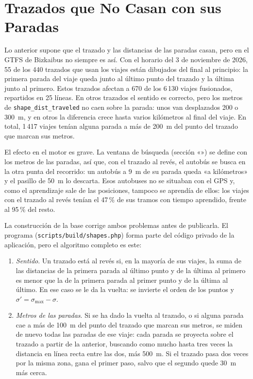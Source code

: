 \section{Trazados que No Casan con sus Paradas}
\label{sec:trazados-gtfs}

Lo anterior supone que el trazado y las distancias de las paradas casan, pero en el GTFS de Bizkaibus no siempre es así.
Con el horario del 3 de noviembre de 2026, 55 de los 440 trazados que usan los viajes están dibujados del final al
principio: la primera parada del viaje queda junto al último punto del trazado y la última junto al primero. Estos trazados afectan a
670 de los 6\,130 viajes fusionados, repartidos en 25 líneas. En otros trazados el sentido es correcto, pero los metros
de \texttt{shape\_dist\_traveled} no caen sobre la parada: unos van desplazados 200 o 300~m, y en otros la diferencia
crece hasta varios kilómetros al final del viaje. En total, 1\,417 viajes tenían alguna parada a más de 200~m del punto
del trazado que marcan sus metros.

El efecto en el motor es grave. La ventana de búsqueda (sección «») se define con los metros de
las paradas, así que, con el trazado al revés, el autobús se busca en la otra punta del recorrido: un autobús a 9~m de su
parada queda «a kilómetros» y el pasillo de 50~m lo descarta. Esos autobuses no se situaban con el GPS y, como el
aprendizaje sale de las posiciones, tampoco se aprendía de ellos: los viajes con el trazado al revés tenían el 47\,\% de sus
tramos con tiempo aprendido, frente al 95\,\% del resto.

La construcción de la base corrige ambos problemas antes de publicarla. El programa
(\texttt{scripts/build/shapes.php}) forma parte del código privado de la aplicación, pero el algoritmo completo es
este:

\begin{enumerate}
  \item \emph{Sentido}. Un trazado está al revés si, en la mayoría de sus viajes, la suma de las distancias de la
        primera parada al último punto y de la última al primero es menor que la de la primera parada al primer punto
        y de la última al último. En ese caso se le da la vuelta: se invierte el orden de los puntos y
        $\sigma'=\sigma_{\max}-\sigma$.
  \item \emph{Metros de las paradas}. Si se ha dado la vuelta al trazado, o si alguna parada cae a más de 100~m del
        punto del trazado que marcan sus metros, se miden de nuevo todas las paradas de ese viaje: cada parada se
        proyecta sobre el trazado a partir de la anterior, buscando como mucho hasta tres veces la distancia en línea
        recta entre las dos, más 500~m. Si el trazado pasa dos veces por la misma zona, gana el primer paso, salvo que
        el segundo quede 30~m más cerca.
\end{enumerate}

